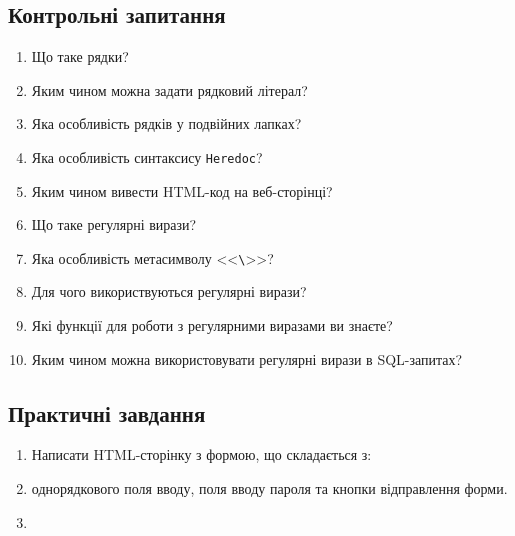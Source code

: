 \subsection*{Контрольні запитання}
\nopagebreak[4]
\begin{enumerate}
\item Що таке рядки?
\item Яким чином можна задати рядковий літерал?
\item Яка особливість рядків у подвійних лапках?
\item Яка особливість синтаксису \verb'Heredoc'? 
\item Яким чином вивести HTML-код на веб-сторінці?
\item Що таке регулярні вирази?
\item Яка особливість метасимволу <<\verb'\'>>?
\item Для чого використвуються регулярні вирази?
\item Які функції для роботи з регулярними виразами ви знаєте?
\item Яким чином можна використовувати регулярні вирази в SQL-запитах?
\end{enumerate}

\subsection*{Практичні завдання}
\nopagebreak[4]


\begin{enumerate}
\item[]Написати HTML-сторінку з формою, що складається з:
\item однорядкового поля вводу, поля вводу пароля та кнопки відправлення форми.
\item 

\end{enumerate}

